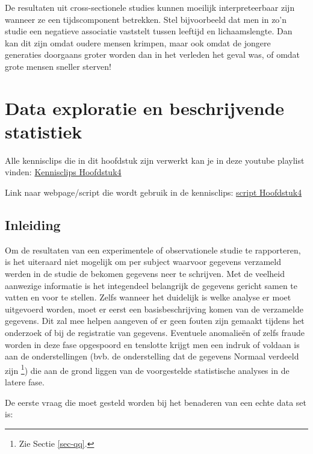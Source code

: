 \documentclass[
  dutch,
  letterpaper,
  12pt]{book}
\theoremstyle{definition}
\theoremstyle{definition}
\theoremstyle{definition}
\theoremstyle{remark}
\begin{document}
De resultaten uit cross-sectionele studies kunnen moeilijk
interpreteerbaar zijn wanneer ze een tijdscomponent betrekken. Stel
bijvoorbeeld dat men in zo'n studie een negatieve associatie vaststelt
tussen leeftijd en lichaamslengte. Dan kan dit zijn omdat oudere mensen
krimpen, maar ook omdat de jongere generaties doorgaans groter worden
dan in het verleden het geval was, of omdat grote mensen sneller
sterven!


\chapter{Data exploratie en beschrijvende
statistiek}\label{sec-chap-describe}

Alle kennisclips die in dit hoofdstuk zijn verwerkt kan je in deze
youtube playlist vinden:
\href{https://www.youtube.com/watch?v=AVd-8WE_DhU&list=PLZH1hP8_LbJLKTeg_D9CHC3xbk0nfBa-1}{Kennisclips
Hoofdstuk4}

Link naar webpage/script die wordt gebruik in de kennisclips:
\href{https://statomics.github.io/sbc/rmd/04-dataExploration.html}{script
Hoofdstuk4}

\section{Inleiding}\label{inleiding-3}

Om de resultaten van een experimentele of observationele studie te
rapporteren, is het uiteraard niet mogelijk om per subject waarvoor
gegevens verzameld werden in de studie de bekomen gegevens neer te
schrijven. Met de veelheid aanwezige informatie is het integendeel
belangrijk de gegevens gericht samen te vatten en voor te stellen. Zelfs
wanneer het duidelijk is welke analyse er moet uitgevoerd worden, moet
er eerst een basisbeschrijving komen van de verzamelde gegevens. Dit zal
mee helpen aangeven of er geen fouten zijn gemaakt tijdens het onderzoek
of bij de registratie van gegevens. Eventuele anomalieën of zelfs fraude
worden in deze fase opgespoord en tenslotte krijgt men een indruk of
voldaan is aan de onderstellingen (bvb. de onderstelling dat de gegevens
Normaal verdeeld zijn \footnote{Zie Sectie \ref{sec-qq}.}) die aan de
grond liggen van de voorgestelde statistische analyses in de latere
fase.

De eerste vraag die moet gesteld worden bij het benaderen van een echte
data set is:
\end{document}
